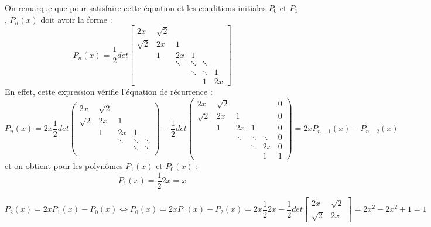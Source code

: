 \documentclass{article}
\begin{document}
On remarque que pour satisfaire cette équation et les conditions initiales $P_0$ et $P_1$, $P_n(x)$ doit avoir la forme : 
$$P_n(x) = \dfrac{1}{2} det
\left[ 
\begin{array}{cccccc}
2x & \sqrt{2} & & & &  \\
\sqrt{2} & 2x & 1 & & & \\
 & 1 & 2x & 1 & & \\
 & & \ddots & \ddots & \ddots & \\
 & & & \ddots & \ddots &  1\\
 & & & &  1 & 2x
\end{array}
\right] 
$$
En effet, cette expression vérifie l'équation de récurrence : 
$$P_n(x) = 2x \dfrac{1}{2} det
\left( 
\begin{array}{ccccc}
2x & \sqrt{2} & & &  \\
\sqrt{2} & 2x & 1 & & \\
 & 1 & 2x & 1 & \\
 & & \ddots & \ddots & \ddots  \\
 & & & \ddots & \ddots   \\
\end{array}
\right) - \dfrac{1}{2} det
\left( 
\begin{array}{cccccc}
2x & \sqrt{2} & & & & 0 \\
\sqrt{2} & 2x & 1 & & & 0\\
 & 1 & 2x & 1 & &  0\\
 & & \ddots & \ddots & \ddots & 0\\
 & & & \ddots & 2x & 0\\
 & & & &  1  & 1
\end{array}
\right) = 2xP_{n-1}(x)-P_{n-2}(x)$$
et on obtient pour les polynômes $P_1(x)$ et $P_0(x)$ : 
$$P_1(x)=\dfrac{1}{2} 2x = x $$

$$P_2(x)=2xP_1(x) - P_0(x) \Longleftrightarrow P_0(x) = 2xP_1(x) - P_2(x) = 2x \dfrac{1}{2} 2x - \dfrac{1}{2} det
\left[ 
\begin{array}{cc}
2x & \sqrt{2} \\
\sqrt{2} & 2x
\end{array}
\right] = 2x^2 - 2x^2 + 1 = 1$$
\end{document}
